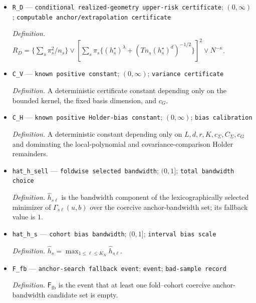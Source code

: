\documentclass{article}
\begin{document}
\begin{itemize}
  \par\smallskip\noindent\emph{Definition.} \(h_s^{\star}=g_{sT}(z_0)\); the dyadic grid defining \(g_{sT}\) enforces the floors \((Tn_s)^{-1/(2\lambda+d)}\) and \(N^{-1/2}\).
  \item \texttt{R\_\allowbreak{}D} --- \texttt{conditional realized-\allowbreak{}geometry upper-\allowbreak{}risk certificate}; \((0,\infty)\); \texttt{computable anchor/\allowbreak{}extrapolation certificate}
  \par\smallskip\noindent\emph{Definition.} \(R_D=\{\sum_s\pi_s^2/n_s\}\vee[\sum_s\pi_s\{(h_s^\star)^\lambda+(Tn_s(h_s^\star)^d)^{-1/2}\}]^2\vee N^{-\kappa}\).
  \item \texttt{C\_\allowbreak{}V} --- \texttt{known positive constant}; \((0,\infty)\); \texttt{variance certificate}
  \par\smallskip\noindent\emph{Definition.} A deterministic certificate constant depending only on the bounded kernel, the fixed basis dimension, and \(c_G\).
  \item \texttt{C\_\allowbreak{}H} --- \texttt{known positive Holder-\allowbreak{}bias constant}; \((0,\infty)\); \texttt{bias calibration}
  \par\smallskip\noindent\emph{Definition.} A deterministic constant depending only on \(L,d,r,K,c_\Sigma,C_\Sigma,c_G\) and dominating the local-polynomial and covariance-comparison Holder remainders.
  \item \texttt{hat\_\allowbreak{}h\_\allowbreak{}sell} --- \texttt{foldwise selected bandwidth}; \((0,1]\); \texttt{total bandwidth choice}
  \par\smallskip\noindent\emph{Definition.} \(\widehat h_{s\ell}\) is the bandwidth component of the lexicographically selected minimizer of \(\Gamma_{s\ell}(u,b)\) over the coercive anchor-bandwidth set; its fallback value is \(1\).
  \item \texttt{hat\_\allowbreak{}h\_\allowbreak{}s} --- \texttt{cohort bias bandwidth}; \((0,1]\); \texttt{interval bias scale}
  \par\smallskip\noindent\emph{Definition.} \(\widehat h_s=\max_{1\le\ell\le K_N}\widehat h_{s\ell}\).
  \item \texttt{F\_\allowbreak{}fb} --- \texttt{anchor-\allowbreak{}search fallback event}; \texttt{event}; \texttt{bad-\allowbreak{}sample record}
  \par\smallskip\noindent\emph{Definition.} \(\mathsf F_{\mathrm{fb}}\) is the event that at least one fold--cohort coercive anchor-bandwidth candidate set is empty.

\end{itemize}
\end{document}
